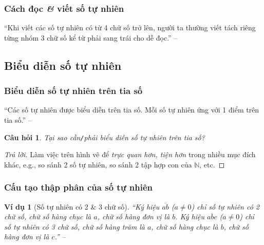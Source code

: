 \documentclass[oneside]{book}
\numberwithin{equation}{section}
\newtheorem{vidu}{Ví dụ}[section]
\newtheorem{cauhoi}{Câu hỏi}[section]
\begin{document}
\subsubsection{Cách đọc \textit{\&} viết số tự nhiên}
``Khi viết các số tự nhiên có từ 4 chữ số trở lên, người ta thường viết tách riêng từng nhóm 3 chữ số kể từ phải sang trái cho dễ đọc.'' -- \cite[p. 9]{Thai_Anh_Dat_Ha_Loan_Nam_Quang_Toan_6_tap_1}

\subsection{Biểu diễn số tự nhiên}

\subsubsection{Biểu diễn số tự nhiên trên tia số}
``Các số tự nhiên được biểu diễn trên tia số. Mỗi số tự nhiên ứng với 1 điểm trên tia số.'' -- \cite[p. 10]{Thai_Anh_Dat_Ha_Loan_Nam_Quang_Toan_6_tap_1}

\begin{cauhoi}
	Tại sao cần\emph{\texttt{/}}phải biểu diễn số tự nhiên trên tia số?
\end{cauhoi}

\begin{proof}[Trả lời]
	Làm việc trên hình vẽ để \textit{trực quan hơn, tiện hơn} trong nhiều mục đích khác, e.g., so sánh 2 số tự nhiên, so sánh 2 tập hợp con của $\mathbb{N}$, etc.
\end{proof}

\subsubsection{Cấu tạo thập phân của số tự nhiên}
\begin{vidu}[Số tự nhiên có 2 \& 3 chữ số]
	``Ký hiệu $\overline{ab}$ ($a\ne 0$) chỉ số tự nhiên có 2 chữ số, chữ số hàng chục là $a$, chữ số hàng đơn vị là $b$. Ký hiệu $\overline{abc}$ ($a\ne 0$) chỉ số tự nhiên có 3 chữ số, chữ số hàng trăm là $a$, chữ số hàng chục là $b$, chữ số hàng đơn vị là $c$.'' -- \cite[p. 10]{Thai_Anh_Dat_Ha_Loan_Nam_Quang_Toan_6_tap_1}
\end{vidu}
\end{document}
